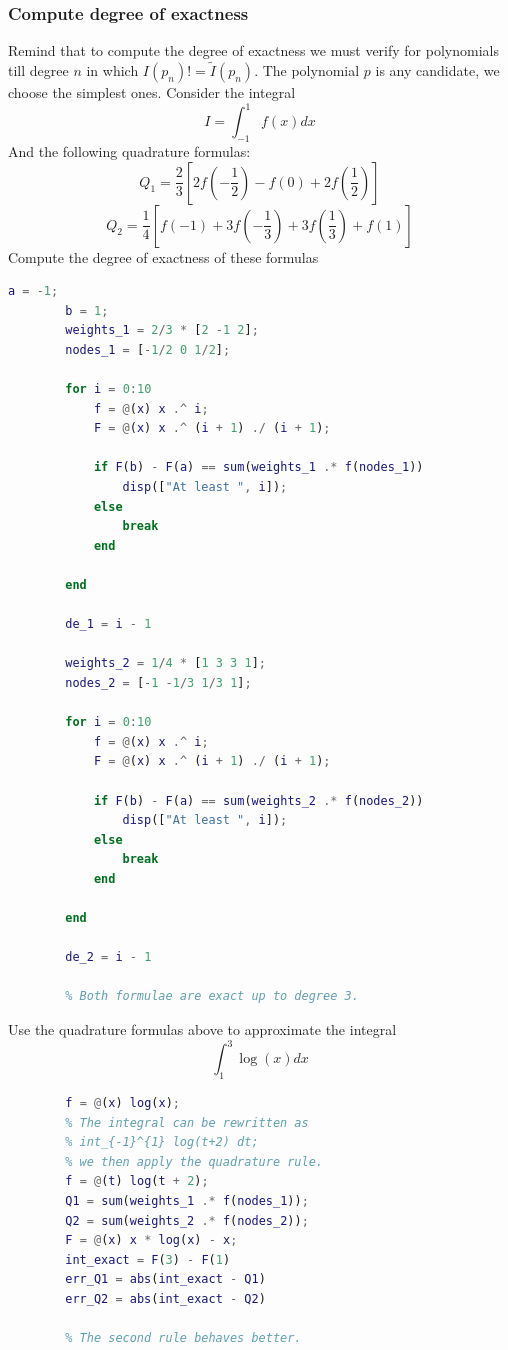     \subsubsection{Compute degree of exactness}
        Remind that to compute the degree of exactness we must verify for polynomials till degree $n$ in which $I(p_n)!=\tilde{I}(p_n)$. The polynomial $p$ is any candidate, we choose the simplest ones. Consider the integral
        $$
        I=\int_{-1}^1f(x)dx
        $$
        And the following quadrature formulas:
        $$
        Q_1=\frac{2}{3}\left[
            2f\left(-\frac{1}{2}\right)
            -f(0)
            +2f\left(\frac{1}{2}\right)
        \right]
        $$
        $$
        Q_2=\frac{1}{4}\left[
            f\left(-1\right)
            +3f\left(-\frac{1}{3}\right)
            +3f\left(\frac{1}{3}\right)
            +f(1)
        \right]
        $$
        Compute the degree of exactness of these formulas
        \begin{lstlisting}[language=Matlab, escapeinside=`', gobble=8]
        a = -1;
        b = 1;
        weights_1 = 2/3 * [2 -1 2];
        nodes_1 = [-1/2 0 1/2];
        
        for i = 0:10
            f = @(x) x .^ i;
            F = @(x) x .^ (i + 1) ./ (i + 1);
        
            if F(b) - F(a) == sum(weights_1 .* f(nodes_1))
                disp(["At least ", i]);
            else
                break
            end
        
        end
        
        de_1 = i - 1
        
        weights_2 = 1/4 * [1 3 3 1];
        nodes_2 = [-1 -1/3 1/3 1];
        
        for i = 0:10
            f = @(x) x .^ i;
            F = @(x) x .^ (i + 1) ./ (i + 1);
        
            if F(b) - F(a) == sum(weights_2 .* f(nodes_2))
                disp(["At least ", i]);
            else
                break
            end
        
        end
        
        de_2 = i - 1
        
        % Both formulae are exact up to degree 3.
        \end{lstlisting}

        Use the quadrature formulas above to approximate the integral
        $$
        \int_1^3\log(x)dx
        $$
        \begin{lstlisting}[language=Matlab, escapeinside=`', gobble=8]
        % integrate
        f = @(x) log(x);
        % The integral can be rewritten as
        % int_{-1}^{1} log(t+2) dt;
        % we then apply the quadrature rule.
        f = @(t) log(t + 2);
        Q1 = sum(weights_1 .* f(nodes_1));
        Q2 = sum(weights_2 .* f(nodes_2));
        F = @(x) x * log(x) - x;
        int_exact = F(3) - F(1)
        err_Q1 = abs(int_exact - Q1)
        err_Q2 = abs(int_exact - Q2)
        
        % The second rule behaves better.
        \end{lstlisting}
    

